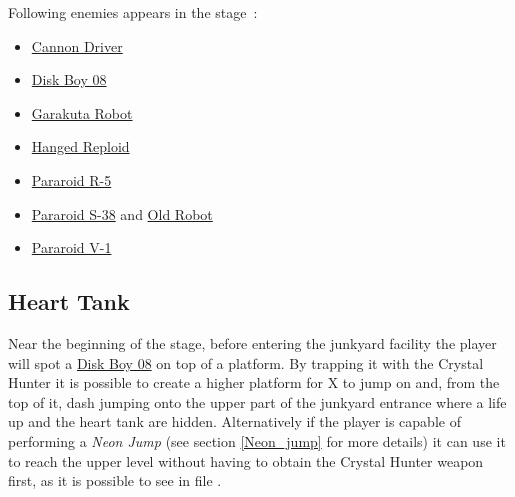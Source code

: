 Following enemies appears in the stage~\cite{wiki:Robot_Junkyard}:
\begin{itemize}
	
	\item \hyperlink {enem:Cannon_Driver}{Cannon Driver}
	\item \hyperlink {enem:Disk_Boy_08}{Disk Boy 08}
	\item \hyperlink {enem:Garakuta_Robot}{Garakuta Robot} 
	\item \hyperlink {enem:Hanged_Reploid}{Hanged Reploid}
	\item \hyperlink {enem:Pararoid_R-5}{Pararoid R-5}
	\item \hyperlink {miniboss:Pararoid_S-38}{Pararoid S-38} and \hyperlink{miniboss:Old_robot}{Old Robot}
	\item \hyperlink {enem:Pararoid_V-1}{Pararoid V-1}
\end{itemize}


\subsection{Heart Tank}
Near the beginning of the stage, before entering the junkyard facility the player will spot a \hyperlink {enem:Disk_Boy_08}{Disk Boy 08} on top of a platform. By trapping it with the Crystal Hunter it is possible to create a higher platform for X to jump on and, from the top of it, dash jumping onto the upper part of the junkyard entrance where a life up and the heart tank are hidden. Alternatively if the player is capable of performing a \emph{Neon Jump} (see section \ref{Neon_jump} for more details) it can use it to reach the upper level without having to obtain the Crystal Hunter weapon first, as it is possible to see in file .

